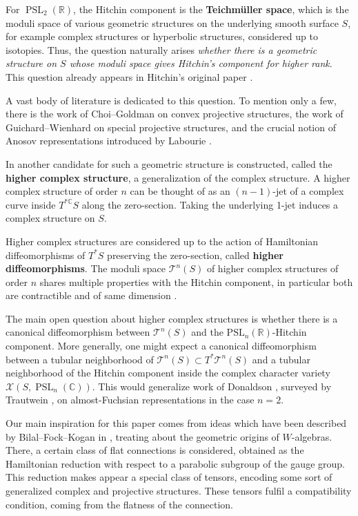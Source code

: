 \documentclass[11pt]{amsart}
\numberwithin{thm}{section} %
\numberwithin{equation}{section} %
\numberwithin{figure}{section} %
\newcommand*{\R}{\mathbb{R}}
\newcommand*{\C}{\mathbb{C}}
\renewcommand*{\S}{S}
\newcommand*{\mc}{\mathcal}
\newcommand*{\T}{\mc{T}}
\DeclareMathOperator{\PSL}{PSL}
\begin{document}
For $\PSL_2(\R)$, the Hitchin component is the \textbf{Teichmüller space}, which is the moduli space of various geometric structures on the underlying smooth surface $\S$, for example complex structures or hyperbolic structures, considered up to isotopies. Thus, the question naturally arises \textit{whether there is a geometric structure on $\S$ whose moduli space gives Hitchin's component for higher rank}. This question already appears in Hitchin's original paper \cite{Hit.1}.

A vast body of literature is dedicated to this question. To mention only a few, there is the work of Choi--Goldman \cite{CG} on convex projective structures, the work of Guichard--Wienhard \cite{GW} on special projective structures, and the crucial notion of Anosov representations introduced by Labourie \cite{Lab}.

\medskip
In \cite{FockThomas} another candidate for such a geometric structure is constructed, called the \textbf{higher complex structure}, a generalization of the complex structure. A higher complex structure of order $n$ can be thought of as an $(n-1)$-jet of a complex curve inside $T^{*\C}S$ along the zero-section. Taking the underlying 1-jet induces a complex structure on $S$.

Higher complex structures are considered up to the action of Hamiltonian diffeomorphisms of $T^*S$ preserving the zero-section, called \textbf{higher diffeomorphisms}. The moduli space $\T^n(S)$ of higher complex structures of order $n$ shares multiple properties with the Hitchin component, in particular both are contractible and of same dimension \cite{FockThomas, Nolte}.

The main open question about higher complex structures is whether there is a canonical diffeomorphism between $\T^n(S)$ and the $\mathrm{PSL}_n(\R)$-Hitchin component. More generally, one might expect a canonical diffeomorphism between a tubular neighborhood of $\T^n(S)\subset T^*\T^n(S)$ and a tubular neighborhood of the Hitchin component inside the complex character variety $\mathcal{X}(S,\PSL_n(\C))$. This would generalize work of Donaldson \cite{Donaldson}, surveyed by Trautwein \cite{Trautwein}, on almost-Fuchsian representations in the case $n=2$.

\medskip
Our main inspiration for this paper comes from ideas which have been described by Bilal--Fock--Kogan in \cite{BFK}, treating about the geometric origins of $W$-algebras. There, a certain class of flat connections is considered, obtained as the Hamiltonian reduction with respect to a parabolic subgroup of the gauge group. This reduction makes appear a special class of tensors, encoding some sort of generalized complex and projective structures. These tensors fulfil a compatibility condition, coming from the flatness of the connection.
\end{document}
